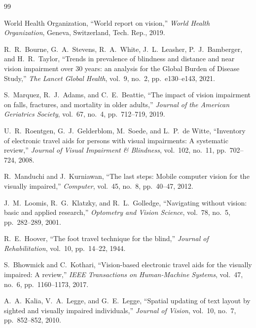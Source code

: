 \documentclass[10pt,twocolumn]{article}
\begin{document}
\begin{thebibliography}{99}
\small

World Health Organization, ``World report on vision,'' \emph{World Health Organization}, Geneva, Switzerland, Tech. Rep., 2019.

R.~R.~Bourne, G.~A.~Stevens, R.~A.~White, J.~L.~Leasher, P.~J.~Bamberger, and H.~R.~Taylor, ``Trends in prevalence of blindness and distance and near vision impairment over 30 years: an analysis for the Global Burden of Disease Study,'' \emph{The Lancet Global Health}, vol.~9, no.~2, pp.~e130--e143, 2021.

S.~Marquez, R.~J.~Adams, and C.~E.~Beattie, ``The impact of vision impairment on falls, fractures, and mortality in older adults,'' \emph{Journal of the American Geriatrics Society}, vol.~67, no.~4, pp.~712--719, 2019.

U.~R.~Roentgen, G.~J.~Gelderblom, M.~Soede, and L.~P.~de Witte, ``Inventory of electronic travel aids for persons with visual impairments: A systematic review,'' \emph{Journal of Visual Impairment \& Blindness}, vol.~102, no.~11, pp.~702--724, 2008.

R.~Manduchi and J.~Kurniawan, ``The last steps: Mobile computer vision for the visually impaired,'' \emph{Computer}, vol.~45, no.~8, pp.~40--47, 2012.

J.~M.~Loomis, R.~G.~Klatzky, and R.~L.~Golledge, ``Navigating without vision: basic and applied research,'' \emph{Optometry and Vision Science}, vol.~78, no.~5, pp.~282--289, 2001.

R.~E.~Hoover, ``The foot travel technique for the blind,'' \emph{Journal of Rehabilitation}, vol.~10, pp.~14--22, 1944.

S.~Bhowmick and C.~Kothari, ``Vision-based electronic travel aids for the visually impaired: A review,'' \emph{IEEE Transactions on Human-Machine Systems}, vol.~47, no.~6, pp.~1160--1173, 2017.

A.~A.~Kalia, V.~A.~Legge, and G.~E.~Legge, ``Spatial updating of text layout by sighted and visually impaired individuals,'' \emph{Journal of Vision}, vol.~10, no.~7, pp.~852--852, 2010.


\end{thebibliography}
\end{document}
